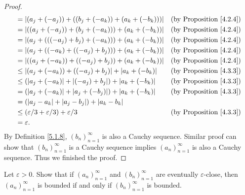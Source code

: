 \begin{proof}
\begin{align*}
&= |(a_j + (-a_j)) + ((b_j + (-a_k)) + (a_k + (-b_k)))| & \text{(by Proposition \ref{4.2.4})} \\
&= |((a_j + (-a_j)) + (b_j + (-a_k))) + (a_k + (-b_k))| & \text{(by Proposition \ref{4.2.4})} \\
&= |(a_j + (((-a_j) + b_j) + (-a_k))) + (a_k + (-b_k))| & \text{(by Proposition \ref{4.2.4})} \\
&= |(a_j + ((-a_k) + ((-a_j) + b_j))) + (a_k + (-b_k))| & \text{(by Proposition \ref{4.2.4})} \\
&= |((a_j + (-a_k)) + ((-a_j) + b_j)) + (a_k + (-b_k))| & \text{(by Proposition \ref{4.2.4})} \\
&\leq |(a_j + (-a_k)) + ((-a_j) + b_j)| + |a_k + (-b_k)| & \text{(by Proposition \ref{4.3.3})} \\
&\leq (|a_j + (-a_k)| + |(-a_j) + b_j|) + |a_k + (-b_k)| & \text{(by Proposition \ref{4.3.3})} \\
&= (|a_j + (-a_k)| + |a_j + (-b_j)|) + |a_k + (-b_k)| & \text{(by Proposition \ref{4.3.3})} \\
&= (|a_j - a_k| + |a_j - b_j|) + |a_k - b_k| \\
&\leq (\varepsilon / 3 + \varepsilon / 3) + \varepsilon / 3 & \text{(by Proposition \ref{4.3.3})} \\
&= \varepsilon.
\end{align*}
By Definition \ref{5.1.8}, \((b_n)_{n = 1}^{\infty}\) is also a Cauchy sequence.
Similar proof can show that \((b_n)_{n = 1}^{\infty}\) is a Cauchy sequence implies \((a_n)_{n = 1}^{\infty}\) is also a Cauchy sequence.
Thus we finished the proof.
\end{proof}

\begin{exercise}\label{ex 5.2.2}
Let \(\varepsilon > 0\).
Show that if \((a_n)_{n = 1}^{\infty}\) and \((b_n)_{n = 1}^{\infty}\) are eventually \(\varepsilon\)-close, then \((a_n)_{n = 1}^{\infty}\) is bounded if and only if \((b_n)_{n = 1}^{\infty}\) is bounded.
\end{exercise}